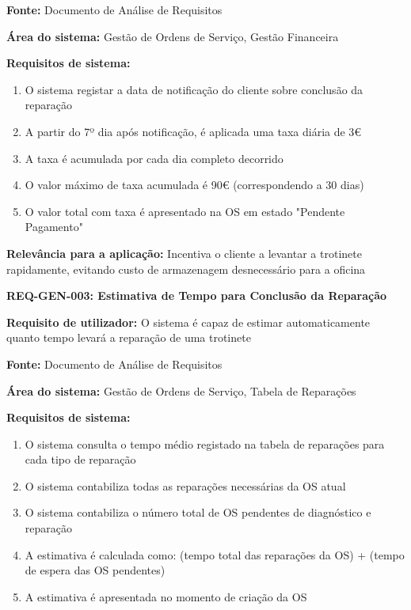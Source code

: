 \documentclass[11pt,a4paper]{article}
\newcommand{\reqheader}[1]{{\noindent\large\bfseries\color{sectionblue}#1}\par\vspace{0.3cm}}
\newcommand{\reqfield}[2]{{\noindent\textbf{#1:} #2}\par\vspace{0.2cm}}
\begin{document}
\reqfield{Fonte}{Documento de Análise de Requisitos}

\reqfield{Área do sistema}{Gestão de Ordens de Serviço, Gestão Financeira}

\reqfield{Requisitos de sistema}{
	\begin{enumerate}
		\item O sistema registar a data de notificação do cliente sobre conclusão da reparação
		\item A partir do 7º dia após notificação, é aplicada uma taxa diária de 3€
		\item A taxa é acumulada por cada dia completo decorrido
		\item O valor máximo de taxa acumulada é 90€ (correspondendo a 30 dias)
		\item O valor total com taxa é apresentado na OS em estado "Pendente Pagamento"
	\end{enumerate}
}

\reqfield{Relevância para a aplicação}{Incentiva o cliente a levantar a trotinete rapidamente, evitando custo de armazenagem desnecessário para a oficina}

\vspace{0.8cm}

\reqheader{REQ-GEN-003: Estimativa de Tempo para Conclusão da Reparação}

\reqfield{Requisito de utilizador}{O sistema é capaz de estimar automaticamente quanto tempo levará a reparação de uma trotinete}

\reqfield{Fonte}{Documento de Análise de Requisitos}

\reqfield{Área do sistema}{Gestão de Ordens de Serviço, Tabela de Reparações}

\reqfield{Requisitos de sistema}{
	\begin{enumerate}
		\item O sistema consulta o tempo médio registado na tabela de reparações para cada tipo de reparação
		\item O sistema contabiliza todas as reparações necessárias da OS atual
		\item O sistema contabiliza o número total de OS pendentes de diagnóstico e reparação
		\item A estimativa é calculada como: (tempo total das reparações da OS) + (tempo de espera das OS pendentes)
		\item A estimativa é apresentada no momento de criação da OS
	\end{enumerate}
}
\end{document}

